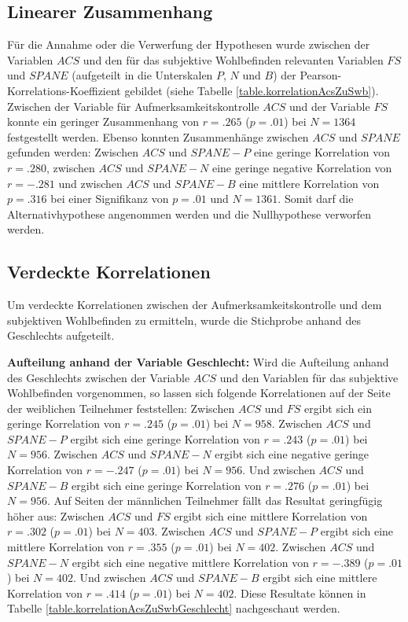 \subsection{Linearer Zusammenhang}
Für die Annahme oder die Verwerfung der Hypothesen wurde zwischen der Variablen $ACS$ und den für das subjektive Wohlbefinden relevanten Variablen $FS$ und $SPANE$ (aufgeteilt in die Unterskalen $P$, $N$ und $B$) der Pearson-Korrelations-Koeffizient gebildet (siehe Tabelle \ref{table.korrelationAcsZuSwb}). Zwischen der Variable für Aufmerksamkeitskontrolle $ACS$ und der Variable $FS$ konnte ein geringer Zusammenhang von $r=.265$ ($p=.01$) bei $N=1364$ festgestellt werden. Ebenso konnten Zusammenhänge zwischen $ACS$ und $SPANE$ gefunden werden: Zwischen $ACS$ und $SPANE-P$ eine geringe Korrelation von $r=.280$, zwischen $ACS$ und $SPANE-N$ eine geringe negative Korrelation von $r=-.281$ und zwischen $ACS$ und $SPANE-B$ eine mittlere Korrelation von $p=.316$ bei einer Signifikanz von $p=.01$ und $N=1361$. Somit darf die Alternativhypothese angenommen werden und die Nullhypothese verworfen werden. 

\subsection{Verdeckte Korrelationen}
Um verdeckte Korrelationen zwischen der Aufmerksamkeitskontrolle und dem subjektiven Wohlbefinden zu ermitteln, wurde die Stichprobe anhand des Geschlechts aufgeteilt.
\par
\textbf{Aufteilung anhand der Variable Geschlecht:} Wird die Aufteilung anhand des Geschlechts zwischen der Variable $ACS$ und den Variablen für das subjektive Wohlbefinden vorgenommen, so lassen sich folgende Korrelationen auf der Seite der weiblichen Teilnehmer feststellen: Zwischen $ACS$ und $FS$ ergibt sich ein geringe Korrelation von $r=.245$ ($p=.01$) bei $N=958$. Zwischen $ACS$ und $SPANE-P$ ergibt sich eine geringe Korrelation von $r=.243$ ($p=.01$) bei $N=956$. Zwischen $ACS$ und $SPANE-N$ ergibt sich eine negative geringe Korrelation von $r=-.247$ ($p=.01$) bei $N=956$. Und zwischen $ACS$ und $SPANE-B$ ergibt sich eine geringe Korrelation von $r=.276$ ($p=.01$) bei $N=956$. Auf Seiten der männlichen Teilnehmer fällt das Resultat geringfügig höher aus: Zwischen $ACS$ und $FS$ ergibt sich eine mittlere Korrelation von $r=.302$ ($p=.01$) bei $N=403$. Zwischen $ACS$ und $SPANE-P$ ergibt sich eine mittlere Korrelation von $r=.355$ ($p=.01$) bei $N=402$. Zwischen $ACS$ und $SPANE-N$ ergibt sich eine negative mittlere Korrelation von $r=-.389$ ($p=.01$) bei $N=402$. Und zwischen $ACS$ und $SPANE-B$ ergibt sich eine mittlere Korrelation von $r=.414$ ($p=.01$) bei $N=402$. Diese Resultate können in Tabelle \ref{table.korrelationAcsZuSwbGeschlecht} nachgeschaut werden.

